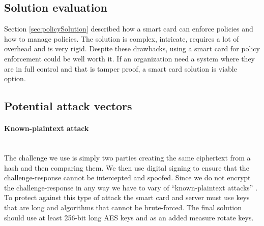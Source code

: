 \subsection{Solution evaluation}
Section \ref{sec:policySolution} described how a smart card can enforce policies and how to manage policies. The solution is complex, intricate, requires a lot of overhead and is very rigid. Despite these drawbacks, using a smart card for policy enforcement could be well worth it. If an organization need a system where they are in full control and that is tamper proof, a smart card solution is viable option.

\subsection{Potential attack vectors}
\paragraph{Known-plaintext attack}\mbox{}\\
The challenge we use is simply two parties creating the same ciphertext from a hash and then comparing them. We then use digital signing to ensure that the challenge-response cannot be intercepted and spoofed. Since we do not encrypt the challenge-response in any way we have to vary of ``known-plaintext attacks'' \cite[~Ch. 2.3.2]{cryptoMath}. To protect against this type of attack the smart card and server must use keys that are long and algorithms that cannot be brute-forced. The final solution should use at least 256-bit long AES keys and as an added measure rotate keys.






